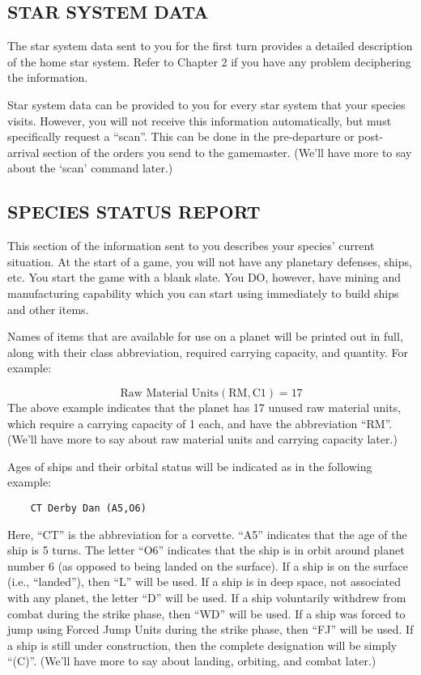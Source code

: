 \documentclass[10pt,titlepage]{article}
\begin{document}
\subsection{STAR SYSTEM DATA}
\label{sec:starsysdata}


The star system data sent to you for the first turn provides a detailed
description of the home star system.  Refer to Chapter 2 if you have any
problem deciphering the information.

Star system data can be provided to you for every star system that your species
visits.  However, you will not receive this information automatically, but must
specifically request a ``scan''.  This can be done in the pre-departure or post-
arrival section of the orders you send to the gamemaster.  (We'll have more to
say about the `scan' command later.)


\subsection{SPECIES STATUS REPORT}
\label{sec:speciesstatusreport}


This section of the information sent to you describes your species' current
situation.  At the start of a game, you will not have any planetary defenses,
ships, etc.  You start the game with a blank slate.  You DO, however, have
mining and manufacturing capability which you can start using immediately
to build ships and other items.

Names of items that are available for use on a planet will be printed out in
full, along with their class abbreviation, required carrying capacity, and
quantity.  For example:

\begin{equation*}
 \textrm{Raw Material Units}(\textrm{RM},\textrm{C1}) = 17
\end{equation*}
The above example indicates that the planet has 17 unused raw material units,
which require a carrying capacity of 1 each, and have the abbreviation ``RM''.
(We'll have more to say about raw material units and carrying capacity later.)

Ages of ships and their orbital status will be indicated as in the following
example:
\begin{verbatim}
	CT Derby Dan (A5,O6)
\end{verbatim}
Here, ``CT'' is the abbreviation for a corvette.  ``A5'' indicates that the age
of the ship is 5 turns.  The letter ``O6'' indicates that the ship is in orbit
around planet number 6 (as opposed to being landed on the surface).  If a ship
is on the surface (i.e., ``landed''), then ``L'' will be used.  If a ship is in
deep space, not associated with any planet, the letter ``D'' will be used.  If a
ship voluntarily withdrew from combat during the strike phase, then ``WD'' will
be used.  If a ship was forced to jump using Forced Jump Units during the
strike phase, then ``FJ'' will be used.  If a ship is still under construction,
then the complete designation will be simply ``(C)''.  (We'll have more to say
about landing, orbiting, and combat later.)
\end{document}
